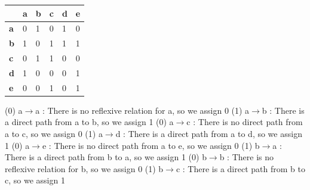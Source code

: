 \documentclass[a4 paper]{article}
\numberwithin{equation}{section}
\newcommand{\0}{\mathbf{0}}
\begin{document}
\begin{table}[h]
\begin{tabular}{|l|l|l|l|l|l|}
\hline
\textbf{}                        & \textbf{a}             & \textbf{b}             & \textbf{c}             & \textbf{d}             & \textbf{e}             \\ \hline
\multicolumn{1}{|l|}{\textbf{a}} & \multicolumn{1}{l|}{0} & \multicolumn{1}{l|}{1} & \multicolumn{1}{l|}{0} & \multicolumn{1}{l|}{1} & \multicolumn{1}{l|}{0} \\ \hline
\multicolumn{1}{|l|}{\textbf{b}} & \multicolumn{1}{l|}{1} & \multicolumn{1}{l|}{0} & \multicolumn{1}{l|}{1} & \multicolumn{1}{l|}{1} & \multicolumn{1}{l|}{1} \\ \hline
\multicolumn{1}{|l|}{\textbf{c}} & \multicolumn{1}{l|}{0} & \multicolumn{1}{l|}{1} & \multicolumn{1}{l|}{1} & \multicolumn{1}{l|}{0} & \multicolumn{1}{l|}{0} \\ \hline
\multicolumn{1}{|l|}{\textbf{d}} & \multicolumn{1}{l|}{1} & \multicolumn{1}{l|}{0} & \multicolumn{1}{l|}{0} & \multicolumn{1}{l|}{0} & \multicolumn{1}{l|}{1} \\ \hline
\textbf{e}                       & 0                      & 0                      & 1                      & 0                      & 1                      \\ \hline
\end{tabular}
\end{table}
\newline\newline\newline\newline
(0) a$\to$a : There is no reflexive relation for a, so we assign 0
\newline
(1) a$\to$b : There is a direct path from a to b, so we assign 1
\newline
(0) a$\to$c : There is no direct path from a to c, so we assign 0
\newline
(1) a$\to$d : There is a direct path from a to d, so we assign 1
\newline
(0) a$\to$e : There is no direct path from a to e, so we assign 0
\newline\newline
(1) b$\to$a : There is a direct path from b to a, so we assign 1
\newline
(0) b$\to$b : There is no reflexive relation for b, so we assign 0
\newline
(1) b$\to$c : There is a direct path from b to c, so we assign 1
\newline
\end{document}
